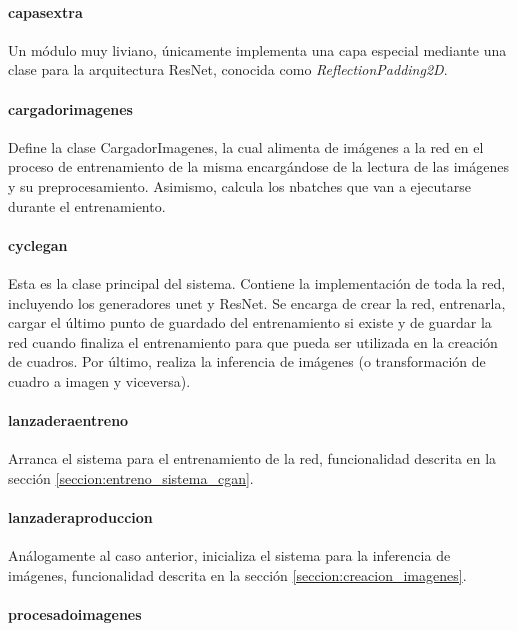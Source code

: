 \documentclass[../main.tex]{subfiles}
\begin{document}
    \paragraph{capas\textunderscore extra}
    Un módulo muy liviano, únicamente implementa una capa especial mediante una clase para la arquitectura ResNet, conocida como \textit{ReflectionPadding2D}.
    
    \paragraph{cargador\textunderscore imagenes}
    Define la clase CargadorImagenes, la cual alimenta de imágenes a la red en el proceso de entrenamiento de la misma encargándose de la lectura de las imágenes y su preprocesamiento. Asimismo, calcula los n\textunderscore batches que van a ejecutarse durante el entrenamiento. 
    
    \paragraph{cyclegan}
    Esta es la clase principal del sistema. Contiene la implementación de toda la red, incluyendo los generadores unet y ResNet. Se encarga de crear la red, entrenarla, cargar el último punto de guardado del entrenamiento si existe y de guardar la red cuando finaliza el entrenamiento para que pueda ser utilizada en la creación de cuadros. Por último, realiza la inferencia de imágenes (o transformación de cuadro a imagen y viceversa).
    
    \paragraph{lanzadera\textunderscore entreno}
    Arranca el sistema para el entrenamiento de la red, funcionalidad descrita en la sección \ref{seccion:entreno_sistema_cgan}.
    
    \paragraph{lanzadera\textunderscore produccion}
    Análogamente al caso anterior, inicializa el sistema para la inferencia de imágenes, funcionalidad descrita en la sección \ref{seccion:creacion_imagenes}.
    
    \paragraph{procesado\textunderscore imagenes}
    
\end{document}
